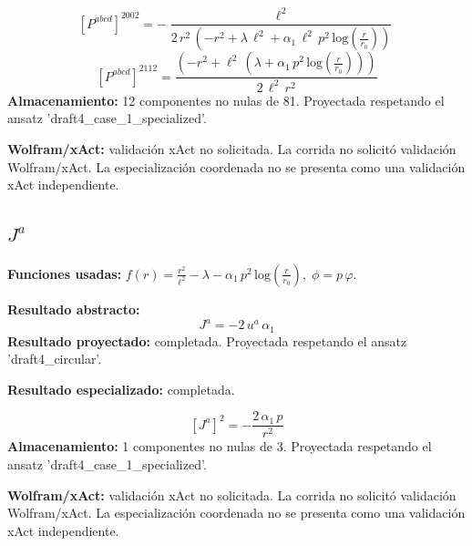 \documentclass[11pt]{article}
\begin{document}
\begin{dmath*}[breakdepth={5}]
\left[P^{abcd}\right]^{2002} = -\frac{{\ell}^{2}}{2\,{r}^{2}\,\left(-{r}^{2} + \lambda\,{\ell}^{2} + \alpha_{1}\,{\ell}^{2}\,{p}^{2}\,\mathrm{log}\!\left(\frac{r}{r_{0}}\right)\right)}
\end{dmath*}
\begin{dmath*}[breakdepth={5}]
\left[P^{abcd}\right]^{2112} = \frac{\left(-{r}^{2} + {\ell}^{2}\,\left(\lambda + \alpha_{1}\,{p}^{2}\,\mathrm{log}\!\left(\frac{r}{r_{0}}\right)\right)\right)}{2\,{\ell}^{2}\,{r}^{2}}
\end{dmath*}
\textbf{Almacenamiento:} 12 componentes no nulas de 81. Proyectada respetando el ansatz 'draft4\_case\_1\_specialized'.\par
\textbf{Wolfram/xAct:} validación xAct no solicitada. La corrida no solicitó validación Wolfram/xAct. La especialización coordenada no se presenta como una validación xAct independiente.\par\medskip
{}
\subsection*{$ J^a $}
\textbf{Funciones usadas:} $ f\!\left(r\right) = \frac{{r}^{2}}{{\ell}^{2}} - \lambda - \alpha_{1}\,{p}^{2}\,\mathrm{log}\!\left(\frac{r}{r_{0}}\right),\;\phi=p\,\varphi $.\par
\textbf{Resultado abstracto:}
\begin{dmath*}[breakdepth={5}]
J^a = -2\,u{}^{a}\,\alpha_{1}
\end{dmath*}
\textbf{Resultado proyectado:} completada. Proyectada respetando el ansatz 'draft4\_circular'.\par
\textbf{Resultado especializado:} completada.\par
\begin{dmath*}[breakdepth={5}]
\left[J^a\right]^{2} = -\frac{2\,\alpha_{1}\,p}{{r}^{2}}
\end{dmath*}
\textbf{Almacenamiento:} 1 componentes no nulas de 3. Proyectada respetando el ansatz 'draft4\_case\_1\_specialized'.\par
\textbf{Wolfram/xAct:} validación xAct no solicitada. La corrida no solicitó validación Wolfram/xAct. La especialización coordenada no se presenta como una validación xAct independiente.\par\medskip
{}
\end{document}
